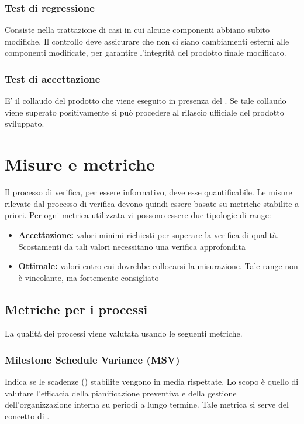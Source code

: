 \documentclass[12pt,a4paper]{article}
\begin{document}
\subsubsection{Test di regressione}
Consiste nella trattazione di casi in cui alcune componenti abbiano subito modifiche. Il controllo deve assicurare che non ci siano cambiamenti esterni alle componenti modificate, per garantire l'integrità del prodotto finale modificato.

\subsubsection{Test di accettazione}
E' il collaudo del prodotto  che viene eseguito in presenza del . Se tale collaudo viene superato positivamente si può procedere al rilascio ufficiale del prodotto sviluppato. 

\newpage

\section{Misure e metriche}\label{metriche}
Il processo di verifica, per essere informativo, deve esse quantificabile. Le misure rilevate dal processo di verifica devono quindi essere basate su metriche stabilite a priori. Per ogni metrica utilizzata vi possono essere due tipologie di range:

\begin{itemize}
	\item \textbf{Accettazione:} valori minimi richiesti per superare la verifica di qualità. Scostamenti da tali valori necessitano una verifica approfondita
	\item \textbf{Ottimale:} valori entro cui dovrebbe collocarsi la misurazione. Tale range non è vincolante, ma fortemente consigliato
\end{itemize}

\subsection{Metriche per i processi}\label{metriche_processi}
La qualità dei processi viene valutata usando le seguenti metriche.

\subsubsection{Milestone Schedule Variance (MSV)}
Indica se le scadenze () stabilite vengono in media rispettate. Lo scopo è quello di valutare l'efficacia della pianificazione preventiva e della gestione dell'organizzazione interna su periodi a lungo termine. Tale metrica si serve del concetto di .
\end{document}
